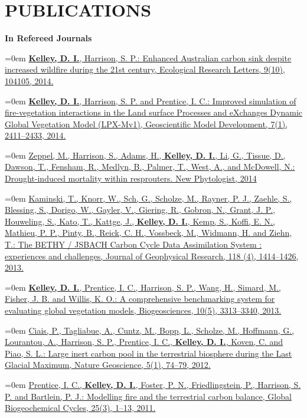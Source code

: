 \documentclass[paper=a4,fontsize=11pt]{scrartcl}	 			%
\newcommand{\sepspace}{\vspace*{0em}}			%
\newcommand{\NewPart}[1]{\vspace*{-0.5em} \section*{\uppercase{#1}} \vspace*{-0.75em} }
\newcommand{\BibEntry}[2]{
		\vspace*{-1em} \noindent \textbf{#1} \hfill \par					%
		\hangindent=0em\hangafter=0 \small #2} 	%
\begin{document}
\NewPart{Publications}

\BibEntry{\newline In Refereed Journals}{\href{http://iopscience.iop.org/1748-9326/9/10/104015}{\textbf{Kelley, D. I.}, Harrison, S. P.: Enhanced Australian carbon sink despite increased wildfire during the 21st century, Ecological Research Letters, 9(10), 104105, 2014.}}

\BibEntry{}{\href{http://www.geosci-model-dev-discuss.net/7/931/2014/gmdd-7-931-2014.html}{\textbf{Kelley, D. I.}, Harrison, S. P. and Prentice, I. C.: Improved simulation of fire-vegetation interactions in the Land surface Processes and eXchanges Dynamic Global Vegetation Model (LPX-Mv1), Geoscientific Model Development, 7(1), 2411--2433, 2014.}}

\BibEntry{}{\href{http://onlinelibrary.wiley.com/doi/10.1111/nph.13205/full}{Zeppel, M., Harrison, S., Adams, H., \textbf{Kelley, D. I.}, Li, G., Tissue, D., Dawson, T., Fensham, R., Medlyn, B., Palmer, T., West, A., and McDowell, N.: Drought-induced mortality within resprouters. New Phytologist, 2014}}

\BibEntry{} {\href{http://onlinelibrary.wiley.com/doi/10.1002/jgrg.20118/abstract}{Kaminski, T., Knorr, W., Sch, G., Scholze, M., Rayner, P. J., Zaehle, S., Blessing, S., Dorigo, W., Gayler, V., Giering, R., Gobron, N., Grant, J. P., Houweling, S., Kato, T., Kattge, J., \textbf{Kelley, D. I.}, Kemp, S., Koffi, E. N., Mathieu, P. P., Pinty, B., Reick, C. H., Vossbeck, M., Widmann, H. and Ziehn, T.: The BETHY / JSBACH Carbon Cycle Data Assimilation System : experiences and challenges, Journal of Geophysical Research, 118 (4), 1414--1426, 2013.}}


\BibEntry{} {\href{http://www.biogeosciences.net/10/3313/2013/bg-10-3313-2013.html}{\textbf{Kelley, D. I.}, Prentice, I. C., Harrison, S. P., Wang, H., Simard, M., Fisher, J. B. and Willis, K. O.: A comprehensive benchmarking system for evaluating global vegetation models, Biogeosciences, 10(5), 3313--3340, 2013.}}


\BibEntry{} {\href{http://www.nature.com/ngeo/journal/v5/n1/full/ngeo1324.html}{Ciais, P., Tagliabue, A., Cuntz, M., Bopp, L., Scholze, M., Hoffmann, G., Lourantou, A., Harrison, S. P., Prentice, I. C., \textbf{Kelley, D. I.}, Koven, C. and Piao, S. L.: Large inert carbon pool in the terrestrial biosphere during the Last Glacial Maximum, Nature Geoscience, 5(1), 74--79, 2012.}}


\BibEntry{} {\href{http://onlinelibrary.wiley.com/doi/10.1029/2010GB003906/abstract}{Prentice, I. C., \textbf{Kelley, D. I.}, Foster, P. N., Friedlingstein, P., Harrison, S. P. and Bartlein, P. J.: Modelling fire and the terrestrial carbon balance, Global Biogeochemical Cycles, 25(3), 1--13, 2011.}}
\sepspace
\end{document}

